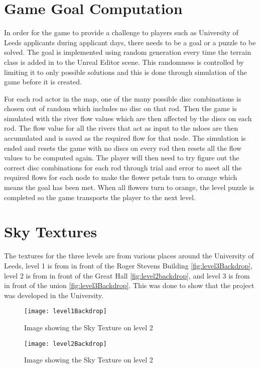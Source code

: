 \section{Game Goal Computation}
In order for the game to provide a challenge to players such as University of Leeds applicants during applicant days, there needs to be a goal or a puzzle to be solved. The goal is implemented using random generation every time the terrain class is added in to the Unreal Editor scene. This randomness is controlled by limiting it to only possible solutions and this is done through simulation of the game before it is created.
\newline
\par
For each rod actor in the map, one of the many possible disc combinations is chosen out of random which includes no disc on that rod. Then the game is simulated with the river flow values which are then affected by the discs on each rod. The flow value for all the rivers that act as input to the ndoes are then accumulated and is saved as the required flow for that node. The simulation is ended and resets the game with no discs on every rod then resets all the flow values to be computed again. The player will then need to try figure out the correct disc combinations for each rod through trial and error to meet all the required flows for each node to make the flower petals turn to orange which means the goal has been met. When all flowers turn to orange, the level puzzle is completed so the game transports the player to the next level.

\section{Sky Textures}
The textures for the three levels are from various places around the University of Leeds, level 1 is from in front of the Roger Stevens Building \ref{fig:level3Backdrop}, level 2 is from in front of the Great Hall \ref{fig:level2backdrop}, and level 3 is from in front of the union \ref{fig:level3Backdrop}. This was done to show that the project was developed in the University.

\begin{figure}[H]
	\texttt{[image: level1Backdrop]}
	\centering
	\caption{Image showing the Sky Texture on level 2}
	\label{fig:level1Backdrop}
\end{figure}

\begin{figure}[H]
	\texttt{[image: level2Backdrop]}
	\centering
	\caption{Image showing the Sky Texture on level 2}
	\label{fig:level2Backdrop}
\end{figure}

